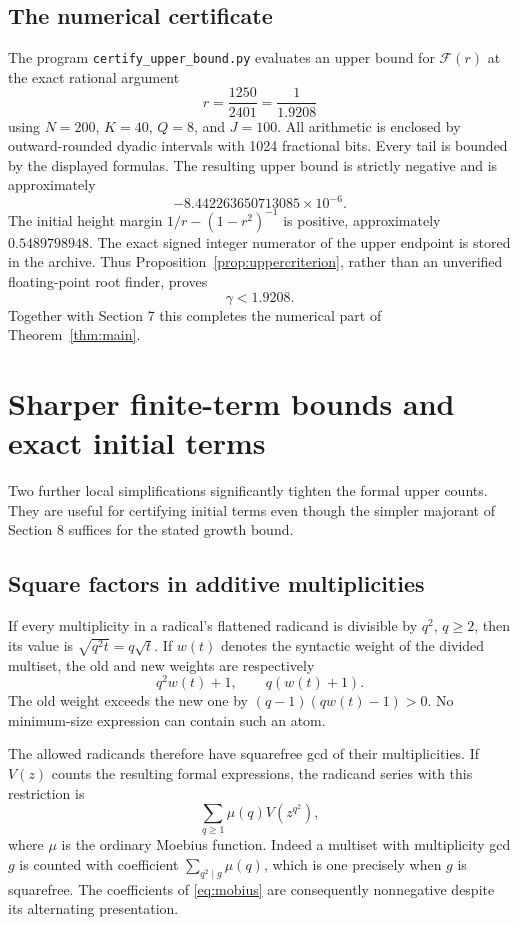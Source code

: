 \documentclass[11pt,letterpaper]{article}
\numberwithin{equation}{section}
\theoremstyle{definition}
\begin{document}
\subsection{The numerical certificate}

The program \texttt{certify\_upper\_bound.py} evaluates an upper bound for
$\mathcal F(r)$ at the exact rational argument
\[
 r=\frac{1250}{2401}=\frac1{1.9208}
\]
using $N=200$, $K=40$, $Q=8$, and $J=100$.
All arithmetic is enclosed by outward-rounded dyadic intervals with
1024 fractional bits. Every tail is bounded by the displayed formulas.
The resulting upper bound is strictly negative and is approximately
\begin{equation}\label{eq:Fvalue}
 -8.442263650713085\times10^{-6}.
\end{equation}
The initial height margin $1/r-(1-r^2)^{-1}$ is positive, approximately
$0.5489798948$.
The exact signed integer numerator of the upper endpoint is stored in the
archive. Thus Proposition~\ref{prop:uppercriterion}, rather than an unverified
floating-point root finder, proves
\[
 \boxed{\gamma<1.9208.}
\]
Together with Section 7 this completes the numerical part of
Theorem~\ref{thm:main}.

\section{Sharper finite-term bounds and exact initial terms}

Two further local simplifications significantly tighten the formal upper
counts. They are useful for certifying initial terms even though the simpler
majorant of Section 8 suffices for the stated growth bound.

\subsection{Square factors in additive multiplicities}

If every multiplicity in a radical's flattened radicand is divisible by
$q^2$, $q\ge2$, then its value is $\sqrt{q^2t}=q\sqrt t$.
If $w(t)$ denotes the syntactic weight of the divided multiset, the old and
new weights are respectively
\[
 q^2w(t)+1,\qquad q(w(t)+1).
\]
The old weight exceeds the new one by $(q-1)(qw(t)-1)>0$.
No minimum-size expression can contain such an atom.

The allowed radicands therefore have squarefree gcd of their multiplicities.
If $V(z)$ counts the resulting formal expressions, the radicand series with
this restriction is
\begin{equation}\label{eq:mobius}
 \sum_{q\ge1}\mu(q)V(z^{q^2}),
\end{equation}
where $\mu$ is the ordinary Moebius function. Indeed a multiset with
multiplicity gcd $g$ is counted with coefficient
$\sum_{q^2\mid g}\mu(q)$, which is one precisely when $g$ is squarefree.
The coefficients of \eqref{eq:mobius} are consequently nonnegative despite
its alternating presentation.
\end{document}
